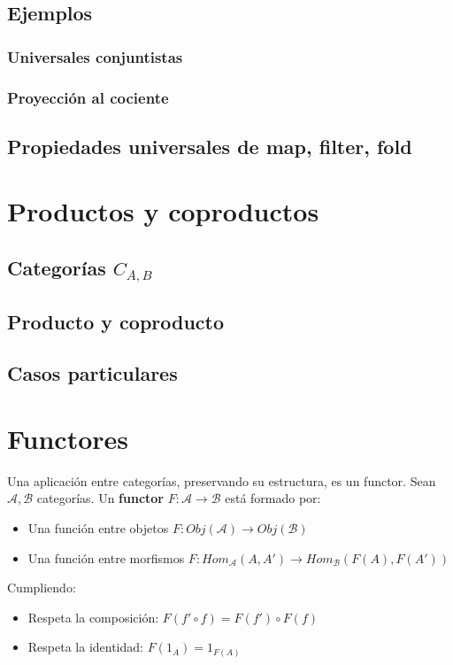 \documentclass[a4paper, 11pt]{amsart}
\theoremstyle{definition}
\theoremstyle{remark}
\numberwithin{equation}{section}
\begin{document}
    
  \subsection {Ejemplos}
    \subsubsection {Universales conjuntistas}
    \subsubsection {Proyección al cociente}
    
  \subsection {Propiedades universales de map, filter, fold}

\newpage
\section {Productos y coproductos}
  \subsection{Categorías $C_{A,B}$}
  \subsection{Producto y coproducto}
  \subsection{Casos particulares}
  
\newpage
\section {Functores}
  Una aplicación entre categorías, preservando su estructura, es un functor.
   Sean $\mathcal{A}, \mathcal{B}$ categorías. Un \textbf{functor} 
  $F: \mathcal{A} \rightarrow \mathcal{B}$ está formado por:
  \begin{itemize}
   \item Una función entre objetos $F: Obj(\mathcal{A}) \rightarrow Obj(\mathcal{B})$
   \item Una función entre morfismos $F: Hom_\mathcal{A}(A,A') \rightarrow Hom_\mathcal{B}(F(A),F(A'))$
  \end{itemize}
  Cumpliendo:
  \begin{itemize}
   \item Respeta la composición: $F(f' \circ f) = F(f') \circ F(f)$
   \item Respeta la identidad: $F(1_A) = 1_{F(A)}$
  \end{itemize}
\end{document}
